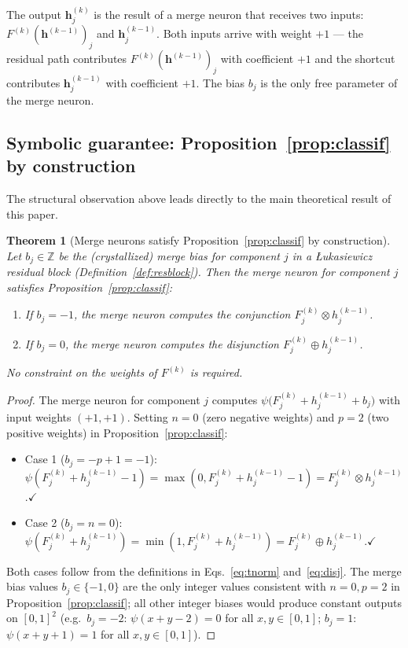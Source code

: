 \documentclass[10pt,a4paper,twoside]{article}
\newtheorem{theorem}{Theorem}
\newcommand{\tnorm}{\otimes}      %
\newcommand{\disj}{\oplus}        %
\begin{document}
The output $\mathbf{h}^{(k)}_j$ is the result of a merge neuron that receives
two inputs: $F^{(k)}(\mathbf{h}^{(k-1)})_j$ and $\mathbf{h}^{(k-1)}_j$.
Both inputs arrive with weight $+1$ --- the residual path contributes
$F^{(k)}(\mathbf{h}^{(k-1)})_j$ with coefficient $+1$ and the shortcut
contributes $\mathbf{h}^{(k-1)}_j$ with coefficient $+1$.
The bias $b_j$ is the only free parameter of the merge neuron.

\subsection{Symbolic guarantee: Proposition~\ref{prop:classif} by construction}
\label{ssec:res_theorem}

The structural observation above leads directly to the main theoretical result
of this paper.

\begin{theorem}[Merge neurons satisfy Proposition~\ref{prop:classif} by construction]
\label{thm:merge}
Let $b_j \in \mathbb{Z}$ be the (crystallized) merge bias for component $j$
in a \L{}ukasiewicz residual block (Definition~\ref{def:resblock}).
Then the merge neuron for component $j$ satisfies Proposition~\ref{prop:classif}:
\begin{enumerate}
  \item If $b_j = -1$, the merge neuron computes the conjunction
        $F^{(k)}_j \tnorm h^{(k-1)}_j$.
  \item If $b_j = 0$, the merge neuron computes the disjunction
        $F^{(k)}_j \disj h^{(k-1)}_j$.
\end{enumerate}
No constraint on the weights of $F^{(k)}$ is required.
\end{theorem}

\begin{proof}
The merge neuron for component $j$ computes
$\psi\bigl(F^{(k)}_j + h^{(k-1)}_j + b_j\bigr)$
with input weights $(+1, +1)$.
Setting $n = 0$ (zero negative weights) and $p = 2$ (two positive weights)
in Proposition~\ref{prop:classif}:
\begin{itemize}
  \item Case 1 ($b_j = -p + 1 = -1$):
    $\psi(F^{(k)}_j + h^{(k-1)}_j - 1)
     = \max(0, F^{(k)}_j + h^{(k-1)}_j - 1)
     = F^{(k)}_j \tnorm h^{(k-1)}_j$.\quad$\checkmark$
  \item Case 2 ($b_j = n = 0$):
    $\psi(F^{(k)}_j + h^{(k-1)}_j)
     = \min(1, F^{(k)}_j + h^{(k-1)}_j)
     = F^{(k)}_j \disj h^{(k-1)}_j$.\quad$\checkmark$
\end{itemize}
Both cases follow from the definitions in Eqs.~\eqref{eq:tnorm}
and~\eqref{eq:disj}.
The merge bias values $b_j \in \{-1, 0\}$ are the only integer values
consistent with $n=0, p=2$ in Proposition~\ref{prop:classif};
all other integer biases would produce constant outputs on $[0,1]^2$
(e.g.\ $b_j = -2$: $\psi(x+y-2) = 0$ for all $x,y \in [0,1]$;
$b_j = 1$: $\psi(x+y+1) = 1$ for all $x,y \in [0,1]$).
\end{proof}
\end{document}
